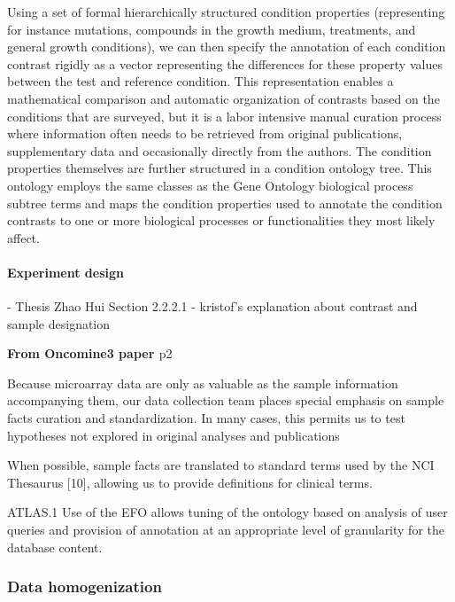 Using a set of formal hierarchically structured condition properties
(representing for instance mutations, compounds in the growth medium,
treatments, and general growth conditions), we can then specify the annotation
of each condition contrast rigidly as a vector representing the differences for
these property values between the test and reference condition.
%
This representation enables a mathematical comparison and automatic
organization of contrasts based on the conditions that are surveyed, but it is
a labor intensive manual curation process where information often needs to be
retrieved from original publications, supplementary data and occasionally
directly from the authors.
%
The condition properties themselves are further structured in a condition
ontology tree.
%
This ontology employs the same classes as the Gene Ontology biological process
subtree terms \cite{Gene2010} and maps the condition properties used to
annotate the condition contrasts to one or more biological processes or
functionalities they most likely affect.



\paragraph{Experiment design}

- Thesis Zhao Hui Section 2.2.2.1
- kristof's explanation about contrast and sample designation


\textbf{From Oncomine3 paper \cite{Rhodes2007}} p2

Because microarray data are only as valuable as the sample information
accompanying them, our data collection team places special
emphasis on sample facts curation and standardization. In
many cases, this permits us to test hypotheses not explored
in original analyses and publications 

When possible, sample facts are translated to standard terms used
by the NCI Thesaurus [10], allowing us to provide definitions
for clinical terms.




\cite{Parkinson2009} ATLAS.1
Use of the EFO allows
tuning of the ontology based on analysis of user queries
and provision of annotation at an appropriate level of
granularity for the database content. 




\subsubsection{Data homogenization}

